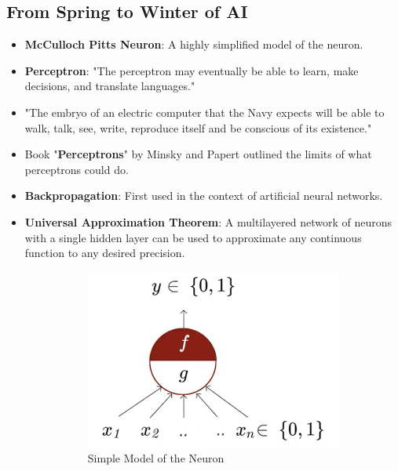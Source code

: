 \documentclass[a4paper]{article}
\begin{document}
\subsection{From Spring to Winter of AI}
\begin{itemize}
    \item \textbf{McCulloch Pitts Neuron}: A highly simplified model of the neuron.
    \item \textbf{Perceptron}: "The perceptron may eventually be able to learn, make decisions, and translate languages."
    \item "The embryo of an electric computer that the Navy expects will be able to walk, talk, see, write, reproduce itself and be conscious of its existence."
    \item Book "\textbf{Perceptrons}" by Minsky and Papert outlined the limits of what perceptrons could do.
    \item \textbf{Backpropagation}: First used in the context of artificial neural networks.
    \item \textbf{Universal Approximation Theorem}: A multilayered network of neurons with a single hidden layer can be used to approximate any continuous function to any desired precision.
    \begin{figure}[H]
        \centering
        \begin{subfigure}[b]{0.45\textwidth}
             \centering
             \includegraphics[width=\textwidth]{Degree/static/DL_simple_neuron.png}
             \caption{Simple Model of the Neuron}
             \label{fig:DL-simple-neuron}
         \end{subfigure}
         \hfill
        \begin{subfigure}[b]{0.45\textwidth}

\end{subfigure}
\end{figure}
\end{itemize}
\end{document}
